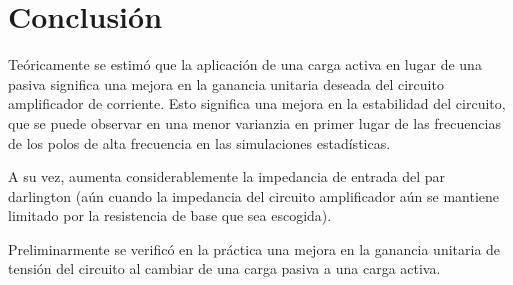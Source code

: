 \chapter{Conclusión}

Teóricamente se estimó que la aplicación de una carga activa en lugar de una pasiva significa una mejora en la ganancia unitaria deseada del circuito amplificador de corriente. Esto significa una mejora en la estabilidad del circuito, que se puede observar en una menor varianzia en primer lugar de las frecuencias de los polos de alta frecuencia en las simulaciones estadísticas.

A su vez, aumenta considerablemente la impedancia de entrada del par darlington (aún cuando la impedancia del circuito amplificador aún se mantiene limitado por la resistencia de base que sea escogida).

Preliminarmente se verificó en la práctica una mejora en la ganancia unitaria de tensión del circuito al cambiar de una carga pasiva a una carga activa.